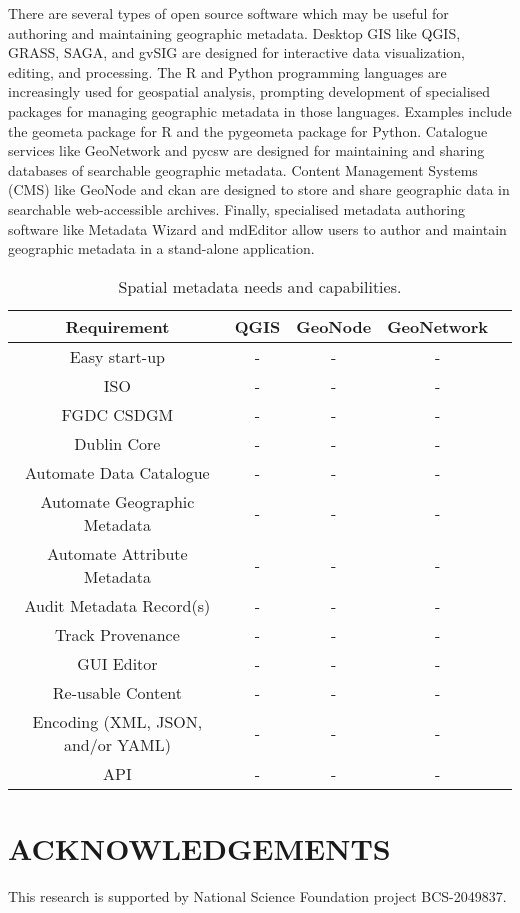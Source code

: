 \documentclass{isprs} %
\begin{document}
There are several types of open source software which may be useful for authoring and maintaining geographic metadata.
Desktop GIS like QGIS, GRASS, SAGA, and gvSIG are designed for interactive data visualization, editing, and processing.
The R and Python programming languages are increasingly used for geospatial analysis, prompting development of specialised packages for managing geographic metadata in those languages. Examples include the geometa package for R and the pygeometa package for Python.
Catalogue services like GeoNetwork and pycsw are designed for maintaining and sharing databases of searchable geographic metadata.
Content Management Systems (CMS) like GeoNode and ckan are designed to store and share geographic data in searchable web-accessible archives.
Finally, specialised metadata authoring software like Metadata Wizard and mdEditor allow users to author and maintain geographic metadata in a stand-alone application.

\begin{table*}[h]
	\centering
		\begin{tabular}{|c|c|c|c|c|}\hline
		    Requirement&QGIS&GeoNode&GeoNetwork\\\hline
			 Easy start-up & - & - & - \\
			 ISO & - & - & - \\
			 FGDC CSDGM & - & - & - \\
			 Dublin Core & - & - & - \\
			 Automate Data Catalogue & - & - & - \\
			 Automate Geographic Metadata & - & - & - \\
			 Automate Attribute Metadata & - & - & - \\
			 Audit Metadata Record(s) & - & - & - \\
			 Track Provenance & - & - & - \\
 			 GUI Editor & - & - & - \\
 			 Re-usable Content & - & - & - \\
			 Encoding (XML, JSON, and/or YAML) & - & - & - \\
			 API & - & - & - \\\hline
		\end{tabular}
	\caption{Spatial metadata needs and capabilities.}
\label{tab:Metadata_Software}
\end{table*}

\section*{ACKNOWLEDGEMENTS}\label{ACKNOWLEDGEMENTS}
This research is supported by National Science Foundation project BCS-2049837.
\end{document}
